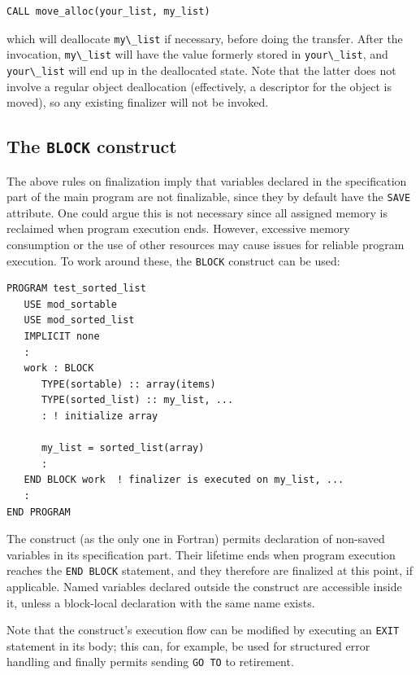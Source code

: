 \documentclass[
  paper=a4,
  ,captions=tableheading
]{scrartcl}
\newcommand{\passthrough}[1]{#1}
\begin{document}
\begin{lstlisting}
CALL move_alloc(your_list, my_list)
\end{lstlisting}

which will deallocate \passthrough{\lstinline!my\_list!} if necessary,
before doing the transfer. After the invocation,
\passthrough{\lstinline!my\_list!} will have the value formerly stored
in \passthrough{\lstinline!your\_list!}, and
\passthrough{\lstinline!your\_list!} will end up in the deallocated
state. Note that the latter does not involve a regular object
deallocation (effectively, a descriptor for the object is moved), so any
existing finalizer will not be invoked.

\subsection{\texorpdfstring{The \texttt{BLOCK}
construct}{The BLOCK construct}}\label{the-block-construct}

The above rules on finalization imply that variables declared in the
specification part of the main program are not finalizable, since they
by default have the \passthrough{\lstinline!SAVE!} attribute. One could
argue this is not necessary since all assigned memory is reclaimed when
program execution ends. However, excessive memory consumption or the use
of other resources may cause issues for reliable program execution. To
work around these, the \passthrough{\lstinline!BLOCK!} construct can be
used:

\begin{lstlisting}
PROGRAM test_sorted_list
   USE mod_sortable
   USE mod_sorted_list
   IMPLICIT none
   :
   work : BLOCK
      TYPE(sortable) :: array(items)
      TYPE(sorted_list) :: my_list, ...
      : ! initialize array

      my_list = sorted_list(array)
      :
   END BLOCK work  ! finalizer is executed on my_list, ...
   :
END PROGRAM
\end{lstlisting}

The construct (as the only one in Fortran) permits declaration of
non-saved variables in its specification part. Their lifetime ends when
program execution reaches the \passthrough{\lstinline!END BLOCK!}
statement, and they therefore are finalized at this point, if
applicable. Named variables declared outside the construct are
accessible inside it, unless a block-local declaration with the same
name exists.

Note that the construct's execution flow can be modified by executing an
\passthrough{\lstinline!EXIT!} statement in its body; this can, for
example, be used for structured error handling and finally permits
sending \passthrough{\lstinline!GO TO!} to retirement.
\end{document}
